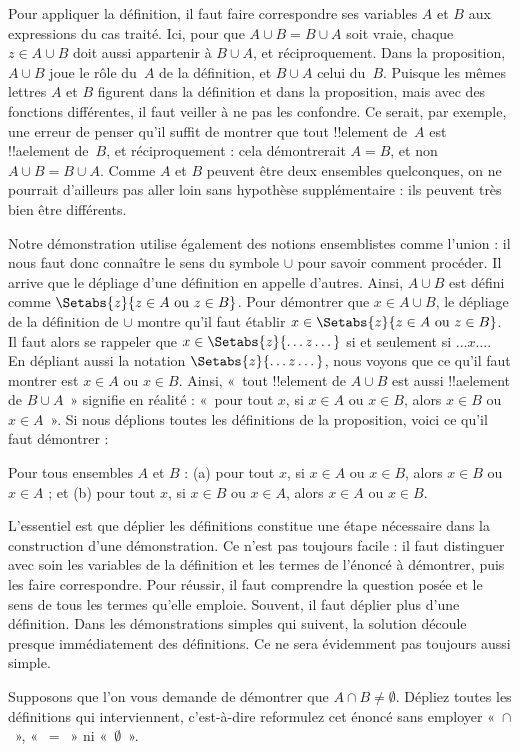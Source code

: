 \documentclass[../../../include/open-logic-section]{subfiles}
\begin{document}
Pour appliquer la définition,
il faut faire correspondre
ses variables $A$ et $B$
aux expressions du cas traité.
Ici, pour que
$A \cup B = B \cup A$
soit vraie, chaque
$z \in A \cup B$ doit
aussi appartenir à
$B \cup A$, et
réciproquement. Dans
la proposition,
$A \cup B$ joue le rôle
du~$A$ de la définition,
et $B \cup A$ celui
du~$B$. Puisque les mêmes
lettres $A$ et $B$
figurent dans la définition
et dans la proposition,
mais avec des fonctions
différentes, il faut veiller
à ne pas les confondre.
Ce serait, par exemple,
une erreur de penser qu'il
suffit de montrer que
tout !!{element} de~$A$
est !!a{element} de~$B$,
et réciproquement :
cela démontrerait $A = B$,
et non
$A \cup B = B \cup A$.
Comme $A$ et $B$ peuvent
être deux ensembles quelconques,
on ne pourrait d'ailleurs
pas aller loin sans hypothèse
supplémentaire : ils peuvent
très bien être différents.

Notre démonstration utilise
également des notions
ensemblistes comme l'union :
il nous faut donc connaître
le sens du symbole $\cup$
pour savoir comment procéder.
Il arrive que le dépliage
d'une définition en appelle
d'autres. Ainsi,
$A \cup B$ est défini
comme
$\Setabs{z}{z \in A
\text{ ou } z \in B}$.
Pour démontrer que
$x \in A \cup B$,
le dépliage de la définition
de $\cup$ montre qu'il
faut établir
$x \in \Setabs{z}{z \in A
\text{ ou } z \in B}$.
Il faut alors se rappeler
que
$x \in \Setabs{z}{\dots z\dots}$
si et seulement si
$\dots x\dots$.
En dépliant aussi la
notation
$\Setabs{z}{\dots z \dots}$,
nous voyons que ce qu'il
faut montrer est
$x \in A$ ou $x \in B$.
Ainsi, «~tout !!{element}
de $A \cup B$ est aussi
!!a{element} de $B \cup A$~»
signifie en réalité :
«~pour tout $x$, si
$x \in A$ ou $x \in B$,
alors $x \in B$ ou
$x \in A$~».
Si nous déplions toutes
les définitions de la
proposition, voici ce
qu'il faut démontrer :

\begin{prop}
Pour tous ensembles $A$
et $B$ : (a) pour tout
$x$, si $x \in A$ ou
$x \in B$, alors
$x \in B$ ou
$x \in A$ ; et
(b) pour tout $x$,
si $x \in B$ ou
$x \in A$, alors
$x \in A$ ou
$x \in B$.
\end{prop}

L'essentiel est que déplier
les définitions constitue
une étape nécessaire dans
la construction d'une
démonstration. Ce n'est
pas toujours facile :
il faut distinguer avec
soin les variables de
la définition et les
termes de l'énoncé à
démontrer, puis les faire
correspondre. Pour réussir,
il faut comprendre la
question posée et le
sens de tous les termes
qu'elle emploie. Souvent,
il faut déplier plus
d'une définition.
Dans les démonstrations
simples qui suivent,
la solution découle
presque immédiatement
des définitions.
Ce ne sera évidemment
pas toujours aussi simple.

\begin{prob}
Supposons que l'on vous
demande de démontrer que
$A \cap B \neq \emptyset$.
Dépliez toutes les
définitions qui interviennent,
c'est-à-dire reformulez
cet énoncé sans employer
«~$\cap$~», «~$=$~»
ni «~$\emptyset$~».
\end{prob}
\end{document}
